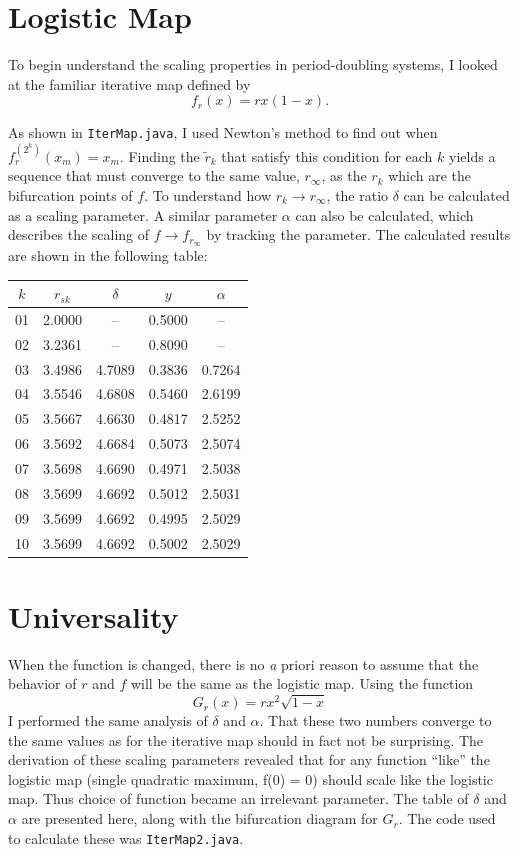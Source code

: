 \documentclass[aps,letterpaper,10pt]{article}
\newcommand{\ttt}{\texttt}
\begin{document}
\section{Logistic Map}

To begin understand the scaling properties in period-doubling systems, I looked at the familiar iterative map defined by
$$ f_r (x) = r x (1-x). $$

As shown in \ttt{IterMap.java}, I used Newton's method to find out when $f^{(2^k)} _r (x_m) = x_m.$ Finding the $\tilde{r}_k$ that satisfy this condition for each $k$ yields a sequence that must converge to the same value, $r_\infty$, as the $r_k$ which are the bifurcation points of $f$. To understand how $r_k\rightarrow r_\infty$, the ratio $\delta$ can be calculated as a scaling parameter. A similar parameter $\alpha$ can also be calculated, which describes the scaling of $f\rightarrow f_{r_\infty}$ by tracking the parameter. The calculated results are shown in the following table:

\begin{center}
\begin{tabular}{|c|c|c|c|c|}
\hline
$k$&$r_{sk}$&$\delta$&$y$&$\alpha$\\
\hline
01&2.0000&--&0.5000&--\\
02&3.2361&--&0.8090&--\\
03&3.4986&4.7089&0.3836&0.7264\\
04&3.5546&4.6808&0.5460&2.6199\\
05&3.5667&4.6630&0.4817&2.5252\\
06&3.5692&4.6684&0.5073&2.5074\\
07&3.5698&4.6690&0.4971&2.5038\\
08&3.5699&4.6692&0.5012&2.5031\\
09&3.5699&4.6692&0.4995&2.5029\\
10&3.5699&4.6692&0.5002&2.5029\\
\hline
\end{tabular}
\end{center}


\section{Universality}
When the function is changed, there is no {\emph a priori} reason to assume that the behavior of $r$ and $f$ will be the same as the logistic map. Using the function $$G_r(x) = rx^2\sqrt{1-x}$$ I performed the same analysis of $\delta$ and $\alpha$. That these two numbers converge to the same values as for the iterative map should in fact not be surprising. The derivation of these scaling parameters revealed that for any function ``like'' the logistic map (single quadratic maximum, f(0) = 0) should scale like the logistic map. Thus choice of function became an irrelevant parameter. The table of $\delta$ and $\alpha$ are presented here, along with the bifurcation diagram for $G_r$. The code used to calculate these was \ttt{IterMap2.java}.
\end{document}
